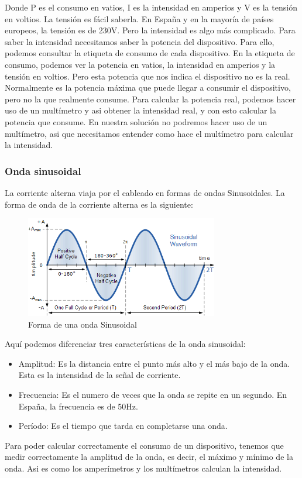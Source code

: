 \begin{titlepage}
Donde P es el consumo en vatios, I es la intensidad en amperios y V es la tensión en voltios. La tensión es fácil saberla. En España y en la mayoría de países europeos, la tensión es de 230V. Pero la intensidad es algo más complicado. Para saber la intensidad necesitamos saber la potencia del dispositivo. Para ello, podemos consultar la etiqueta de consumo de cada dispositivo. En la etiqueta de consumo, podemos ver la potencia en vatios, la intensidad en amperios y la tensión en voltios. Pero esta potencia que nos indica el dispositivo no es la real. Normalmente es la potencia máxima que puede llegar a consumir el dispositivo, pero no la que realmente consume. Para calcular la potencia real, podemos hacer uso de un multímetro y asi obtener la intensidad real, y con esto calcular la potencia que consume. En nuestra solución no podremos hacer uso de un multímetro, asi que necesitamos entender como hace el multímetro para calcular la intensidad. \\

\subsubsection{Onda sinusoidal}
La corriente alterna viaja por el cableado en formas de ondas Sinusoidales. La forma de onda de la corriente alterna es la siguiente: \\ 

\begin{figure}[h!]
	\centering
	\includegraphics[width=0.75\textwidth]{imagenes/sine_wave.png}
	\caption{Forma de una onda Sinusoidal\cite{sine_wave_img}}
\end{figure}
\newpage
Aquí podemos diferenciar tres características de la onda sinusoidal\cite{ref2}: \\
\begin{itemize}
	\item Amplitud: Es la distancia entre el punto más alto y el más bajo de la onda. Esta es la intensidad de la señal de corriente.
	\item Frecuencia: Es el numero de veces que la onda se repite en un segundo. En España, la frecuencia es de 50Hz.
	\item Período: Es el tiempo que tarda en completarse una onda.
\end{itemize}
Para poder calcular correctamente el consumo de un dispositivo, tenemos que medir correctamente la amplitud de la onda, es decir, el máximo y mínimo de la onda. Asi es como los amperímetros y los multímetros calculan la intensidad. \\

\end{titlepage}
